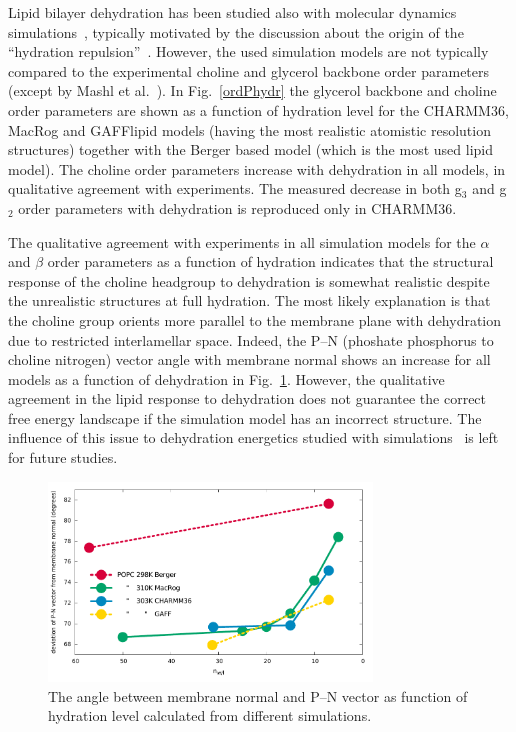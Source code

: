 \documentclass[pre,aps,floatfix,authordate1-4,twocolumn]{revtex4-1}
\begin{document}
Lipid bilayer dehydration has been studied also with molecular dynamics simulations~\cite{mashl01,pertsin05,pertsin07,eun09,eun10,schneck12},
typically motivated by the  discussion about the origin of the ``hydration repulsion''~\cite{israelachvili,israelachvili96,sparr11}.
However, the used simulation models are not typically compared to the experimental choline and glycerol backbone
order parameters (except by Mashl et al.~\cite{mashl01}).
In Fig.~\ref{ordPhydr} the glycerol backbone and choline order parameters are shown as a function of hydration level for the CHARMM36, MacRog and GAFFlipid models (having the most realistic atomistic resolution structures) together with the Berger based model 
(which is the most used lipid model). The choline order parameters increase with dehydration in all
models, in qualitative agreement with experiments. 
The measured decrease in both g$_3$ and g$_2$ order parameters with dehydration is reproduced only in CHARMM36.

The qualitative agreement with experiments in all simulation models for the $\alpha$ and $\beta$ order parameters  
as a function of hydration indicates that the structural response of the choline headgroup to dehydration is somewhat realistic
despite the unrealistic structures at full hydration. 
The most likely explanation is that the choline group
orients more parallel to the membrane plane with dehydration due to restricted interlamellar space. 
Indeed, the P--N (phoshate phosphorus to choline nitrogen) vector angle with membrane normal shows an increase for
all models as a function of dehydration in Fig.~\ref{PNangle}.
However, the qualitative agreement in the lipid response to dehydration does not guarantee the correct 
free energy landscape if the simulation model has an incorrect structure. The influence of this issue to 
dehydration energetics studied with simulations~\cite{eun09,schneck12} is left for future studies.
\begin{figure}[]
  \centering
  \includegraphics[width=8.6cm]{../DATAreportediINblog/dehydrationPN.pdf}

  \caption{\label{PNangle}
    The angle between membrane normal and P--N vector as function of
    hydration level calculated from different simulations.
  }
\end{figure}
\end{document}
